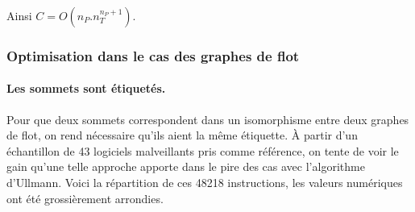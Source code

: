 \begin{pr}
Ainsi $C=O(n_P.n_T^{n_P+1})$.
\end{pr}




\subsubsection{Optimisation dans le cas des graphes de flot\label{sec:ullmann_optimisation}}
\paragraph{Les sommets sont étiquetés.}
Pour que deux sommets correspondent dans un isomorphisme entre deux graphes de flot, on rend nécessaire qu'ils aient la même étiquette.
À partir d'un échantillon de 43 logiciels malveillants pris comme référence, on tente de voir le gain qu'une telle approche apporte dans le pire des cas avec l'algorithme d'Ullmann.
Voici la répartition de ces 48218 instructions, les valeurs numériques ont été grossièrement arrondies.

